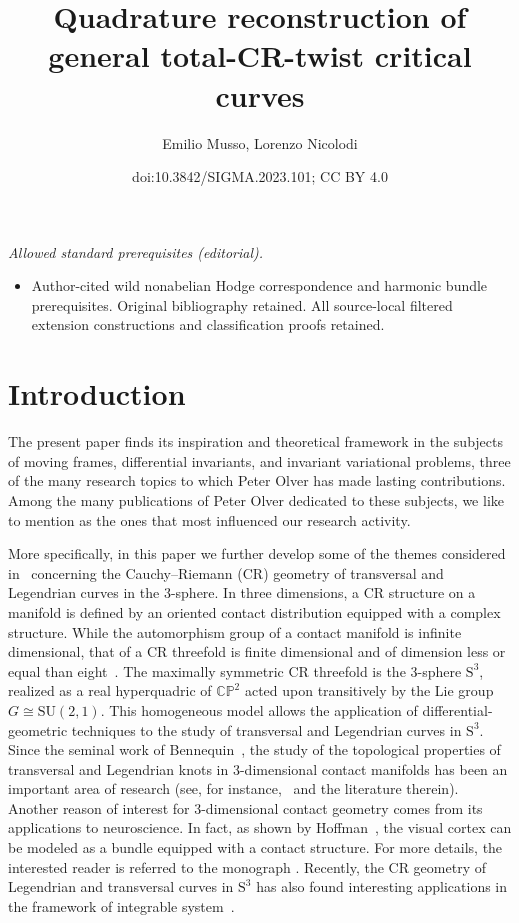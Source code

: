 \documentclass[10pt,a4paper]{amsart}
\title{Quadrature reconstruction of general total-CR-twist critical curves}
\author{Emilio Musso, Lorenzo Nicolodi}
\date{doi:10.3842/SIGMA.2023.101; CC BY 4.0}
\numberwithin{equation}{section}
\begin{document}
\maketitle
\noindent\textit{Allowed standard prerequisites (editorial).}\begin{itemize}
\item Author-cited wild nonabelian Hodge correspondence and harmonic bundle prerequisites. Original bibliography retained. All source-local filtered extension constructions and classification proofs retained.
\end{itemize}\medskip
\section{Introduction}%

The present paper finds its inspiration and theoretical framework in
the subjects of moving frames, differential invariants, and invariant variational problems,
three of the many research topics to which Peter Olver has made
lasting contributions.
%
Among the many publications of
Peter Olver dedicated to these subjects, we like to mention
\cite{FelsOlver1, FelsOlver2,Olver-book1,Olver-book2}
as the ones that most influenced
our research activity.

More specifically, in this paper we further develop some of the themes
considered in~\cite{M,MNS-Kharkiv,MS}
concerning the Cauchy--Riemann (CR) geometry of transversal and Legendrian curves in the 3-sphere.
In three dimensions, a CR structure on a manifold is defined by an oriented contact distribution
equipped with a complex structure.
%
While the automorphism group of a contact manifold is infinite dimensional,
that of a CR threefold is finite dimensional and of dimension less or equal than eight~\cite{Cartan1932-2,Cartan1932,ChMo1974}.
The maximally symmetric CR threefold is the 3-sphere ${\mathrm S}^3$, realized as a real hyperquadric of $\mathbb{CP}^2$
acted upon transitively by the Lie group $G \cong \mathrm{SU}(2,1)$.
This homogeneous model allows the application of
differential-geometric techniques to the study of transversal and Legendrian curves in ${\mathrm S}^3$.
Since the seminal work of Bennequin~\cite{Benn1983}, the study of the topological properties of transversal and Legendrian
knots in 3-dimensional contact manifolds has been an important area of research
(see, for instance,~\cite{Eliash1993,Et3,Etn1999, Et2,EtHo,FuTa1997} and the literature therein).
Another reason of interest for 3-dimensional contact geometry
comes from its applications to neuroscience.
In fact, as shown by Hoffman~\cite{Ho}, the visual cortex can be modeled as a bundle equipped with a contact structure.
For more details, the interested reader is referred to the monograph
\cite[Section~5]{Pe}.
Recently, the CR geometry of Legendrian and transversal curves in ${\mathrm S}^3$ has also found
interesting applications in the framework of integrable system~\cite{CI}.
\end{document}
